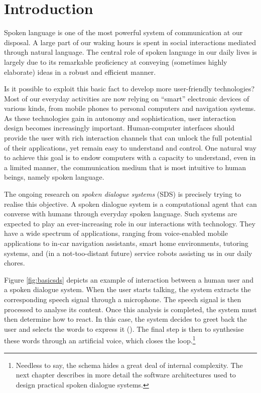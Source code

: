 
\chapter{Introduction}
\setcounter{page}{1}
\pagestyle{plain}

Spoken language is one of the most powerful system of communication at our disposal. A large part of our waking hours is spent in social interactions mediated through natural language.  The central role of spoken language in our daily lives is largely due to its remarkable proficiency at conveying (sometimes highly elaborate) ideas in a robust and efficient manner. 

Is it possible to exploit this basic fact to develop more user-friendly technologies? Most of our everyday activities are now relying on ``smart'' electronic devices of various kinds, from mobile phones to personal computers and navigation systems. As these technologies gain in autonomy and sophistication, user interaction design becomes increasingly important. Human-computer interfaces should provide the user with rich interaction channels that can unlock the full potential of their applications, yet remain easy to understand and control.  One natural way to achieve this goal is to endow computers with a capacity to understand, even in a limited manner, the communication medium that is most intuitive to human beings, namely spoken language.  

The ongoing research on \textit{spoken dialogue systems} (SDS) is precisely trying to realise this objective. A spoken dialogue system is a computational agent that can converse with humans through everyday spoken language. Such systems are expected to play an ever-increasing role in our interactions with technology. They have a wide spectrum of applications, ranging from voice-enabled mobile applications to in-car navigation assistants, smart home environments, tutoring systems, and (in a not-too-distant future) service robots assisting us in our daily chores.

Figure \ref{fig:basicsds} depicts an example of interaction between a human user and a spoken dialogue system. When the user starts talking, the system extracts the corresponding speech signal through a microphone.  The speech signal is then processed to analyse its content.  Once this analysis is completed, the system must then determine how to react.  In this case, the system decides to greet back the user and selects the words to express it (). The final step is then to synthesise these words through an artificial voice, which closes the loop.\footnote{ Needless to say, the schema hides a great deal of internal complexity.  The next chapter describes in more detail the software architectures used to design practical spoken dialogue systems.}

